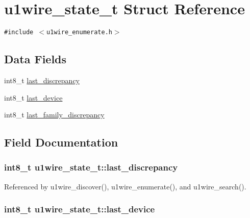 \hypertarget{structu1wire__state__t}{
\section{u1wire\_\-state\_\-t Struct Reference}
\label{structu1wire__state__t}
}
{\tt \#include $<$u1wire\_\-enumerate.h$>$}

\subsection*{Data Fields}
\begin{CompactItemize}
\item 
int8\_\-t \hyperlink{structu1wire__state__t_894121f28712e5b405a2fa283891e7a9}{last\_\-discrepancy}
\item 
int8\_\-t \hyperlink{structu1wire__state__t_459e57e909143573b6bf3d220085adc8}{last\_\-device}
\item 
int8\_\-t \hyperlink{structu1wire__state__t_081ea182a1de94cbc5ed7f4045e50ade}{last\_\-family\_\-discrepancy}
\end{CompactItemize}


\subsection{Field Documentation}
\hypertarget{structu1wire__state__t_894121f28712e5b405a2fa283891e7a9}{
\subsubsection{\setlength{\rightskip}{0pt plus 5cm}int8\_\-t {\bf u1wire\_\-state\_\-t::last\_\-discrepancy}}}
\label{structu1wire__state__t_894121f28712e5b405a2fa283891e7a9}




Referenced by u1wire\_\-discover(), u1wire\_\-enumerate(), and u1wire\_\-search().\hypertarget{structu1wire__state__t_459e57e909143573b6bf3d220085adc8}{
\subsubsection{\setlength{\rightskip}{0pt plus 5cm}int8\_\-t {\bf u1wire\_\-state\_\-t::last\_\-device}}}
\label{structu1wire__state__t_459e57e909143573b6bf3d220085adc8}




